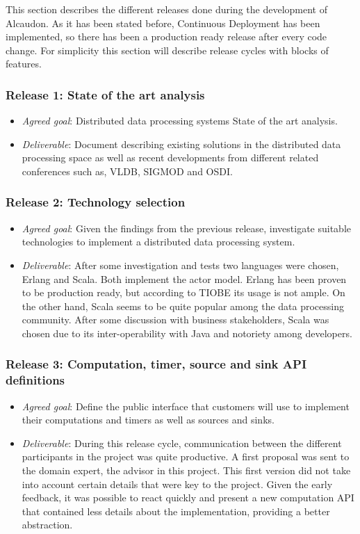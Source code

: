 This section describes the different releases done during the development of
Alcaudon. As it has been stated before, Continuous Deployment has been
implemented, so there has been a production ready release after every code
change. For simplicity this section will describe release cycles with blocks of
features.

\subsubsection{Release 1: State of the art analysis}
\begin{itemize}
\item \textit{Agreed goal}: Distributed data processing systems State of the art analysis.
  \item \textit{Deliverable}: Document describing existing solutions in the
    distributed data processing space as well as recent developments from
    different related conferences such as, VLDB, SIGMOD and OSDI.
\end{itemize}

\subsubsection{Release 2: Technology selection}
\begin{itemize}
\item \textit{Agreed goal}: Given the findings from the previous release,
  investigate suitable technologies to implement a distributed data processing
  system.
\item \textit{Deliverable}: After some investigation and tests two languages
  were chosen, Erlang and Scala. Both implement the actor model. Erlang has been
  proven to be production ready, but according to TIOBE\cite{tiobe} its usage is
  not ample. On the other hand, Scala seems to be quite popular among the data
  processing community. After some discussion with business stakeholders, Scala
  was chosen due to its inter-operability with Java and notoriety among
  developers.
\end{itemize}

\subsubsection{Release 3: Computation, timer, source and sink API definitions}
\begin{itemize}
\item \textit{Agreed goal}: Define the public interface that customers will use
  to implement their computations and timers as well as sources and sinks.
\item \textit{Deliverable}: During this release cycle, communication between the
  different participants in the project was quite productive. A first proposal
  was sent to the domain expert, the advisor in this project. This first version
  did not take into account certain details that were key to the project. Given
  the early feedback, it was possible to react quickly and present a new
  computation API that contained less details about the implementation,
  providing a better abstraction.
\end{itemize}


